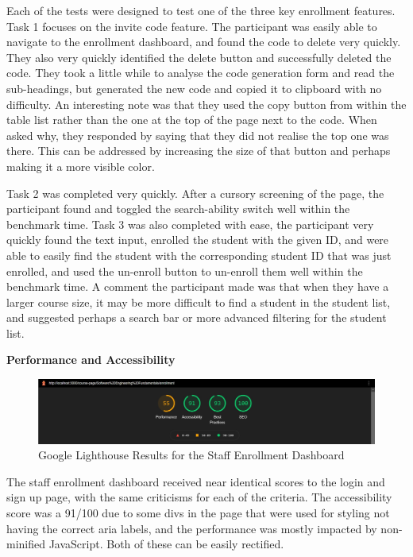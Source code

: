 Each of the tests were designed to test one of the three key enrollment features. Task 1 focuses on the invite code feature. The participant was easily able to navigate to the enrollment dashboard, and found the code to delete very quickly. They also very quickly identified the delete button and successfully deleted the code. They took a little while to analyse the code generation form and read the sub-headings, but generated the new code and copied it to clipboard with no difficulty. An interesting note was that they used the copy button from within the table list rather than the one at the top of the page next to the code. When asked why, they responded by saying that they did not realise the top one was there. This can be addressed by increasing the size of that button and perhaps making it a more visible color.

Task 2 was completed very quickly. After a cursory screening of the page, the participant found and toggled the search-ability switch well within the benchmark time. Task 3 was also completed with ease, the participant very quickly found the text input, enrolled the student with the given ID, and were able to easily find the student with the corresponding student ID that was just enrolled, and used the un-enroll button to un-enroll them well within the benchmark time. A comment the participant made was that when they have a larger course size, it may be more difficult to find a student in the student list, and suggested perhaps a search bar or more advanced filtering for the student list.


\textbf{Performance and Accessibility}

\begin{figure}[h!]
    \centering
    \includegraphics[scale=0.3]{images/accounts-staff-lighthouse.jpg}
    \caption{Google Lighthouse Results for the Staff Enrollment Dashboard}
\end{figure}

The staff enrollment dashboard received near identical scores to the login and sign up page, with the same criticisms for each of the criteria. The accessibility score was a 91/100 due to some divs in the page that were used for styling not having the correct aria labels, and the performance was mostly impacted by non-minified JavaScript. Both of these can be easily rectified.

